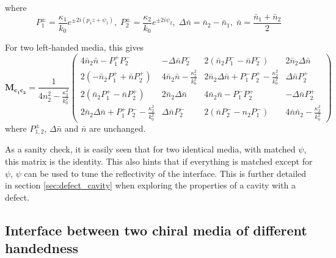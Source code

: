 where
\begin{equation}
P_{1}^\pm = \frac{\kappa_1}{k_0}e^{\pm 2i(p_{1}z+\psi_{1})} ,\;
P_{2}^\pm = \frac{\kappa_2}{k_0}e^{\pm 2i\psi_{2}} ,\; \Delta\bar{n} = \bar{n}_2 - \bar{n}_1 ,\; \bar{n} = \frac{\bar{n}_1+\bar{n}_2}{2}
\end{equation}

For two left-handed media, this gives
\begin{equation}
\bm{M_{c_1c_2}} = \frac{1}{4n_2^2-\frac{\kappa_2^2}{k_0^2}}\begin{pmatrix}
4\bar{n}_2\bar{n}-P_1^+P_2^- & -\Delta\bar{n}P_2^- & 2\left(\bar{n}_2P_1^--\bar{n}P_2^-\right) & 2\bar{n}_2\Delta\bar{n}\\
2\left(-\bar{n}_2P_1^++\bar{n}P_2^+\right) & 4\bar{n}_2\bar{n}-\frac{\kappa_2^2}{k_0^2} & 2\bar{n}_2\Delta\bar{n}+P_1^-P_2^+-\frac{\kappa_2^2}{k_0^2} & \Delta\bar{n}P_2^+ \\
2\left(\bar{n}_2P_1^+-\bar{n}P_2^+\right) & 2\bar{n}_2\Delta\bar{n} & 4\bar{n}_2\bar{n}-P_1^-P_2^+ & -\Delta\bar{n}P_2^+\\
2\bar{n}_2\Delta\bar{n}+P_1^+P_2^--\frac{\kappa_2^2}{k_0^2} & \Delta\bar{n}P_2^- & 2\left(\bar{n}P_2^--n_2P_1^-\right) & 4\bar{n}\bar{n}_2-\frac{\kappa_2^2}{k_0^2}
\end{pmatrix}
\end{equation}
where $P_{1,2}^\pm$, $\Delta\bar{n}$ and $\bar{n}$ are unchanged.

As a sanity check, it is easily seen that for two identical media, with matched $\psi$, this matrix is the identity. This also hints that if everything is matched except for $\psi$, $\psi$ can be used to tune the reflectivity of the interface. This is further detailed in section \ref{sec:defect_cavity} when exploring the properties of a cavity with a defect.

\subsection{Interface between two chiral media of different handedness}

